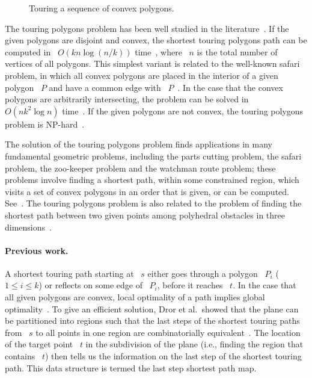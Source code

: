 \documentclass[11pt]{article}
\begin{document}
\begin{figure}[H]
	\centering
	\caption{Touring a sequence of convex polygons.}
	\label{fig:touring}
\end{figure}

The touring polygons problem has been well studied in the literature~\cite{ref8}.
If the given polygons are disjoint and convex, the shortest touring polygons path can be computed in ~\(O(kn\log(n/k))\) time~\cite{ref6}, where ~\(n\) is the total number of vertices of all polygons.
This simplest variant is related to the well-known safari problem, in which all convex polygons are placed in the interior of a given polygon ~\(P\) and have a common edge with ~\(P\)~\cite{ref12}.
In the case that the convex polygons are arbitrarily intersecting, the problem can be solved in ~\(O(nk^2\log n)\) time~\cite{ref6}.
If the given polygons are not convex, the touring polygons problem is NP-hard~\cite{ref1}.

The solution of the touring polygons problem finds applications in many fundamental geometric problems, including the parts cutting problem, the safari problem, the zoo-keeper problem and the watchman route problem; these problems involve finding a shortest path, within some constrained region, which visits a set of convex polygons in an order that is given, or can be computed.
See~\cite{ref2,ref5,ref6,ref11,ref12,ref13,ref14,ref15}.
The touring polygons problem is also related to the problem of finding the shortest path between two given points among polyhedral obstacles in three dimensions~\cite{ref6,ref8}.

\paragraph{Previous work.}
A shortest touring path starting at ~\(s\) either goes through a polygon ~\(P_i\) (~\(1 \le i \le k\)) or reflects on some edge of ~\(P_i\), before it reaches ~\(t\).
In the case that all given polygons are convex, local optimality of a path implies global optimality~\cite{ref6}.
To give an efficient solution, Dror et al.\ showed that the plane can be partitioned into regions such that the last steps of the shortest touring paths from ~\(s\) to all points in one region are combinatorially equivalent~\cite{ref6}.
The location of the target point ~\(t\) in the subdivision of the plane (i.e., finding the region that contains ~\(t\)) then tells us the information on the last step of the shortest touring path.
This data structure is termed the last step shortest path map.
\end{document}
